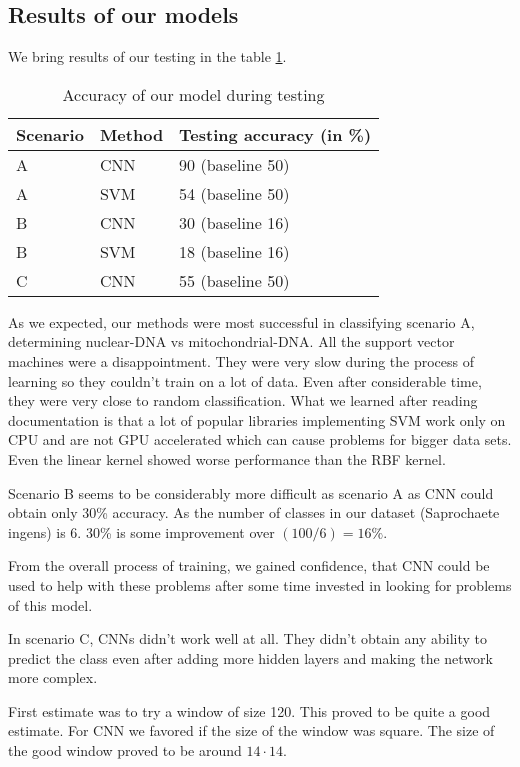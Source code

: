 \subsection{Results of our models}

We bring results of our testing in the table \ref{tab:mlResults}. 

\begin{table}
\caption[Accuracy of our model during testing]{Accuracy of our model during testing}
\label{tab:mlResults}
\begin{center}
\begin{tabular}{|l|l|l|}
\hline
Scenario & Method & Testing accuracy (in \%)\\
\hline
A & CNN & 90 (baseline 50)\\
A & SVM & 54 (baseline 50)\\
B & CNN & 30 (baseline 16)\\
B & SVM & 18 (baseline 16)\\
C & CNN & 55 (baseline 50)\\
\hline
\end{tabular}
\end{center}
\end{table}

As we expected, our methods were most successful in classifying scenario A, determining
nuclear-DNA vs mitochondrial-DNA. All the support vector machines were a disappointment.
They were very slow during the process of learning so they couldn't train on a lot of
data. Even after considerable time, they were very close to random classification.
What we learned after reading documentation is that a lot of popular libraries
implementing SVM work only on CPU and are not GPU accelerated which can cause
problems for bigger data sets. Even the linear kernel showed worse performance than the RBF kernel.

\medskip

Scenario B seems to be considerably more difficult as scenario A as CNN could obtain
only 30\% accuracy. As the number of classes in our dataset (Saprochaete ingens)
is 6. 30\% is some improvement over $(100/6)=16\%$.

From the overall process of training, we gained confidence, that CNN could
be used to help with these problems after some time invested in looking for
problems of this model.

\medskip

In scenario C, CNNs didn't work well at all. They didn't obtain any ability to predict
the class even after adding more hidden layers and making the network more complex.

\medskip

First estimate was to try a window of size 120. This proved to be quite a good estimate.
For CNN we favored if the size of the window was square. The size of the good window
proved to be around $14\cdot 14$.
